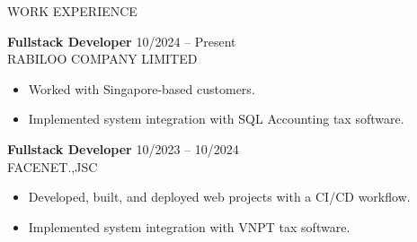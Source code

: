 \documentclass{resume}
\begin{document}
\begin{rSection}{WORK EXPERIENCE}

\textbf{Fullstack Developer} \hfill 10/2024 -- Present\\
RABILOO COMPANY LIMITED
\begin{itemize}
    \itemsep -3pt {}
    \item Worked with Singapore-based customers.
    \item Implemented system integration with SQL Accounting tax software.
\end{itemize}
 
\textbf{Fullstack Developer} \hfill 10/2023 -- 10/2024\\
FACENET.,JSC
\begin{itemize}
    \itemsep -3pt {}
    \item Developed, built, and deployed web projects with a CI/CD workflow.
    \item Implemented system integration with VNPT tax software.
\end{itemize}

\end{rSection}
\end{document}
